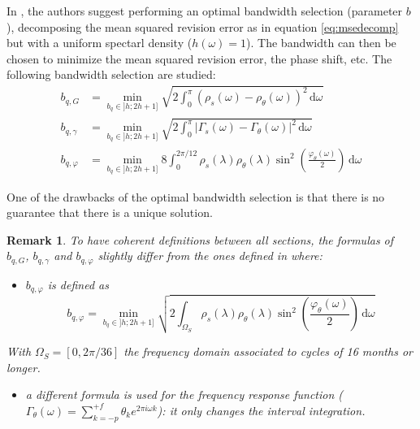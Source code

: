 \documentclass[
  12pt,
  ,
  a4paper]{article}
\providecommand{\tightlist}{%
  \setlength{\itemsep}{0pt}\setlength{\parskip}{0pt}}
\newcommand\1{\mathds{1}}
\newcommand\ud{\,\mathrm{d}}
\newtheorem*{remark}{Remark}
\begin{document}
In \textcite{dagumbianconcini2015}, the authors suggest performing an optimal bandwidth selection (parameter \(b\)), decomposing the mean squared revision error as in equation \eqref{eq:msedecomp} but with a uniform spectarl density (\(h(\omega)=1\)).
The bandwidth can then be chosen to minimize the mean squared revision error, the phase shift, etc.
The following bandwidth selection are studied:
\begin{align*}
b_{q,G}&=\underset{b_q\in]h;2 h+1]}{\min}
\sqrt{2\int_{0}^{\pi}
\left(\rho_s(\omega)-\rho_\theta(\omega)\right)^{2}\ud \omega
}\\
b_{q,\gamma}&=\underset{b_q\in]h;2 h+1]}{\min}
\sqrt{2\int_{0}^{\pi}
\lvert \Gamma_s(\omega)-\Gamma_\theta(\omega)\rvert^2\ud \omega
} \\
b_{q,\varphi}&=\underset{b_q\in]h;2 h+1]}{\min}
8\int_{0}^{2\pi/12}
\rho_s(\lambda)\rho_\theta(\lambda)\sin^{2}\left(\frac{\varphi_\theta(\omega)}{2}\right)\ud \omega
\end{align*}

One of the drawbacks of the optimal bandwidth selection is that there is no guarantee that there is a unique solution.

\begin{remark}

To have coherent definitions between all sections, the formulas of \(b_{q,G}\), \(b_{q,\gamma}\) and \(b_{q,\varphi}\) slightly differ from the ones defined in \textcite{dagumbianconcini2015} where:

\begin{itemize}
\tightlist
\item
  \(b_{q,\varphi}\) is defined as
  \[
  b_{q,\varphi}=\underset{b_q\in]h;2 h+1]}{\min}
  \sqrt{2\int_{\Omega_S}
  \rho_s(\lambda)\rho_\theta(\lambda)\sin^{2}\left(\frac{\varphi_\theta(\omega)}{2}\right)\ud \omega}
  \]
\end{itemize}

With \(\Omega_S=[0,2\pi/36]\) the frequency domain associated to cycles of 16 months or longer.

\begin{itemize}
\tightlist
\item
  a different formula is used for the frequency response function (\(\Gamma_\theta(\omega)=\sum_{k=-p}^{+f} \theta_k e^{2\pi i \omega k}\)): it only changes the interval integration.
\end{itemize}

\end{remark}
\end{document}
